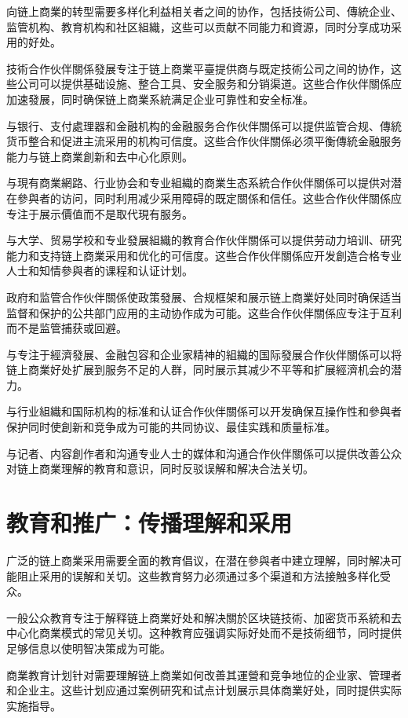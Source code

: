 \documentclass[
  Letterpaper,
]{scrbook}
\begin{document}
向链上商業的转型需要多样化利益相关者之间的协作，包括技術公司、傳統企业、监管机构、教育机构和社区組織，这些可以贡献不同能力和資源，同时分享成功采用的好处。

技術合作伙伴關係發展专注于链上商業平臺提供商与既定技術公司之间的协作，这些公司可以提供基础设施、整合工具、安全服务和分销渠道。这些合作伙伴關係应加速發展，同时确保链上商業系統满足企业可靠性和安全标准。

与银行、支付處理器和金融机构的金融服务合作伙伴關係可以提供监管合规、傳統货币整合和促进主流采用的机构可信度。这些合作伙伴關係必须平衡傳統金融服务能力与链上商業創新和去中心化原则。

与現有商業網路、行业协会和专业組織的商業生态系統合作伙伴關係可以提供对潜在參與者的访问，同时利用减少采用障碍的既定關係和信任。这些合作伙伴關係应专注于展示價值而不是取代現有服务。

与大学、贸易学校和专业發展組織的教育合作伙伴關係可以提供劳动力培训、研究能力和支持链上商業采用和优化的可信度。这些合作伙伴關係应开发創造合格专业人士和知情參與者的课程和认证计划。

政府和监管合作伙伴關係使政策發展、合规框架和展示链上商業好处同时确保适当监督和保护的公共部门应用的主动协作成为可能。这些合作伙伴關係应专注于互利而不是监管捕获或回避。

与专注于經濟發展、金融包容和企业家精神的組織的国际發展合作伙伴關係可以将链上商業好处扩展到服务不足的人群，同时展示其减少不平等和扩展經濟机会的潜力。

与行业組織和国际机构的标准和认证合作伙伴關係可以开发确保互操作性和參與者保护同时使創新和竞争成为可能的共同协议、最佳实践和质量标准。

与记者、内容創作者和沟通专业人士的媒体和沟通合作伙伴關係可以提供改善公众对链上商業理解的教育和意识，同时反驳误解和解决合法关切。

\section{教育和推广：传播理解和采用}\label{ux6559ux80b2ux548cux63a8ux5e7fux4f20ux64adux7406ux89e3ux548cux91c7ux7528}

广泛的链上商業采用需要全面的教育倡议，在潜在參與者中建立理解，同时解决可能阻止采用的误解和关切。这些教育努力必须通过多个渠道和方法接触多样化受众。

一般公众教育专注于解释链上商業好处和解决關於区块链技術、加密货币系統和去中心化商業模式的常见关切。这种教育应强调实际好处而不是技術细节，同时提供足够信息以使明智决策成为可能。

商業教育计划针对需要理解链上商業如何改善其運營和竞争地位的企业家、管理者和企业主。这些计划应通过案例研究和试点计划展示具体商業好处，同时提供实际实施指导。
\end{document}
